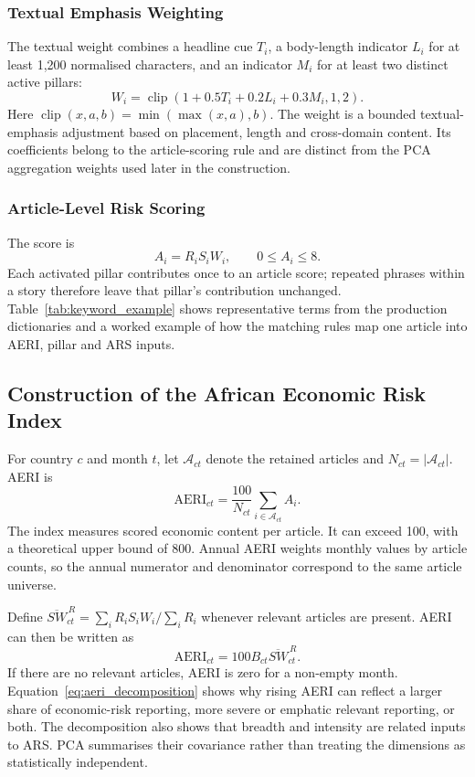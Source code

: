 \documentclass[12pt]{article}
\newcommand{\clip}{\operatorname{clip}}
\begin{document}
\subsubsection{Textual Emphasis Weighting}\label{sec:confidence_weighting}
The textual weight combines a headline cue $T_i$, a body-length indicator $L_i$ for at least 1,200 normalised characters, and an indicator $M_i$ for at least two distinct active pillars:
\begin{equation}W_i=\clip(1+0.5T_i+0.2L_i+0.3M_i,1,2).\label{eq:confidence}\end{equation}
Here $\clip(x,a,b)=\min(\max(x,a),b)$. The weight is a bounded textual-emphasis adjustment based on placement, length and cross-domain content. Its coefficients belong to the article-scoring rule and are distinct from the PCA aggregation weights used later in the construction.
\subsubsection{Article-Level Risk Scoring}\label{sec:article_scoring}
The score is
\begin{equation} A_i=R_iS_iW_i,\qquad 0\leq A_i\leq8.\label{eq:article}\end{equation}
Each activated pillar contributes once to an article score; repeated phrases within a story therefore leave that pillar's contribution unchanged. Table~\ref{tab:keyword_example} shows representative terms from the production dictionaries and a worked example of how the matching rules map one article into AERI, pillar and ARS inputs.

\subsection{Construction of the African Economic Risk Index}\label{sec:aeri}
For country $c$ and month $t$, let $\mathcal A_{ct}$ denote the retained articles and $N_{ct}=|\mathcal A_{ct}|$. AERI is
\begin{equation}\mathrm{AERI}_{ct}=\frac{100}{N_{ct}}\sum_{i\in\mathcal A_{ct}}A_i.\label{eq:aeri}\end{equation}
The index measures scored economic content per article. It can exceed 100, with a theoretical upper bound of 800. Annual AERI weights monthly values by article counts, so the annual numerator and denominator correspond to the same article universe.

Define $\overline{SW}_{ct}^{\,R}=\sum_iR_iS_iW_i/\sum_iR_i$ whenever relevant articles are present. AERI can then be written as
\begin{equation}
 \mathrm{AERI}_{ct}=100B_{ct}\overline{SW}_{ct}^{\,R}.\label{eq:aeri_decomposition}
\end{equation}
If there are no relevant articles, AERI is zero for a non-empty month. Equation~\eqref{eq:aeri_decomposition} shows why rising AERI can reflect a larger share of economic-risk reporting, more severe or emphatic relevant reporting, or both. The decomposition also shows that breadth and intensity are related inputs to ARS. PCA summarises their covariance rather than treating the dimensions as statistically independent.
\end{document}

